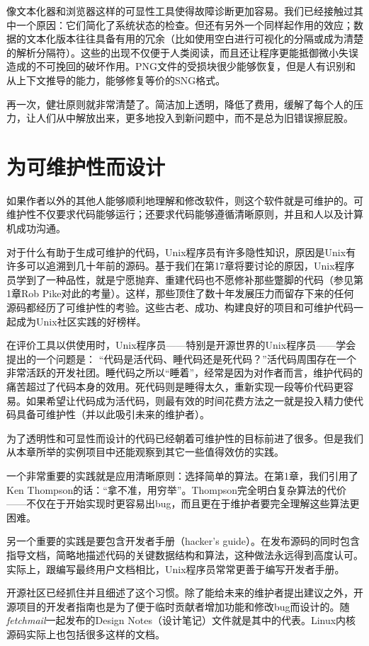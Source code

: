 \documentclass[12pt,oneside]{ctexbook}
\begin{document}
\begin{common-format}
像文本化器和浏览器这样的可显性工具使得故障诊断更加容易。我们已经接触过其中一个原因：它们简化了系统状态的检查。但还有另外一个同样起作用的效应；数据的文本化版本往往具备有用的冗余（比如使用空白进行可视化的分隔或成为清楚的解析分隔符）。这些的出现不仅便于人类阅读，而且还让程序更能抵御微小失误造成的不可挽回的破坏作用。PNG文件的受损块很少能够恢复，但是人有识别和从上下文推导的能力，能够修复等价的SNG格式。

再一次，健壮原则就非常清楚了。简洁加上透明，降低了费用，缓解了每个人的压力，让人们从中解放出来，更多地投入到新问题中，而不是总为旧错误擦屁股。

\section{为可维护性而设计}
如果作者以外的其他人能够顺利地理解和修改软件，则这个软件就是可维护的。可维护性不仅要求代码能够运行；还要求代码能够遵循清晰原则，并且和人以及计算机成功沟通。

对于什么有助于生成可维护的代码，Unix程序员有许多隐性知识，原因是Unix有许多可以追溯到几十年前的源码。基于我们在第17章将要讨论的原因，Unix程序员学到了一种品性，就是宁愿抛弃、重建代码也不愿修补那些蹩脚的代码（参见第1章Rob Pike对此的考量）。这样，那些顶住了数十年发展压力而留存下来的任何源码都经历了可维护性的考验。这些古老、成功、构建良好的项目和可维护代码一起成为Unix社区实践的好榜样。

在评价工具以供使用时，Unix程序员——特别是开源世界的Unix程序员——学会提出的一个问题是：  “代码是活代码、睡代码还是死代码？”活代码周围存在一个非常活跃的开发社团。睡代码之所以“睡着”，经常是因为对作者而言，维护代码的痛苦超过了代码本身的效用。死代码则是睡得太久，重新实现一段等价代码更容易。如果希望让代码成为活代码，则最有效的时间花费方法之一就是投入精力使代码具备可维护性（并以此吸引未来的维护者）。

为了透明性和可显性而设计的代码已经朝着可维护性的目标前进了很多。但是我们从本章所举的实例项目中还能观察到其它一些值得效仿的实践。

一个非常重要的实践就是应用清晰原则：选择简单的算法。在第1章，我们引用了Ken Thompson的话：“拿不准，用穷举”。Thompson完全明白复杂算法的代价——不仅在于开始实现时更容易出bug，而且更在于维护者要完全理解这些算法更困难。

另一个重要的实践是要包含开发者手册（hacker's guide）。在发布源码的同时包含指导文档，简略地描述代码的关键数据结构和算法，这种做法永远得到高度认可。实际上，跟编写最终用户文档相比，Unix程序员常常更善于编写开发者手册。

开源社区已经抓住并且细述了这个习惯。除了能给未来的维护者提出建议之外，开源项目的开发者指南也是为了便于临时贡献者增加功能和修改bug而设计的。随\textit{fetchmail}一起发布的Design Notes（设计笔记）文件就是其中的代表。Linux内核源码实际上也包括很多这样的文档。


\end{common-format}
\end{document}
